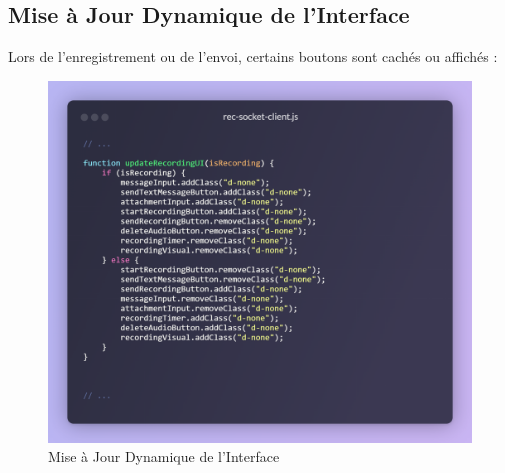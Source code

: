 \subsection*{Mise à Jour Dynamique de l’Interface}

Lors de l'enregistrement ou de l'envoi, certains boutons sont cachés ou affichés :

\begin{figure}[H]
    \centering
    \includegraphics[width=15cm]{assets/annexes/snippet (33).png}
    \caption{ Mise à Jour Dynamique de l’Interface}
\end{figure}
